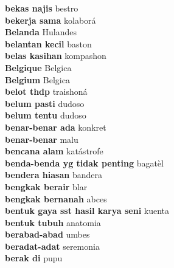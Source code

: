 \textbf{ bekas najis  } bestro \\
\textbf{ bekerja sama  } kolaborá \\
\textbf{ Belanda  } Hulandes \\
\textbf{ belantan kecil  } baston \\
\textbf{ belas kasihan  } kompashon \\
\textbf{ Belgique  } Belgica \\
\textbf{ Belgium  } Belgica \\
\textbf{ belot thdp  } traishoná \\
\textbf{ belum pasti  } dudoso \\
\textbf{ belum tentu  } dudoso \\
\textbf{ benar-benar ada  } konkret \\
\textbf{ benar-benar  } malu \\
\textbf{ bencana alam  } katástrofe \\
\textbf{ benda-benda yg tidak penting  } bagatèl \\
\textbf{ bendera hiasan  } bandera \\
\textbf{ bengkak berair  } blar \\
\textbf{ bengkak bernanah  } abces \\
\textbf{ bentuk gaya sst hasil karya seni  } kuenta \\
\textbf{ bentuk tubuh  } anatomia \\
\textbf{ berabad-abad  } umbes \\
\textbf{ beradat-adat  } seremonia \\
\textbf{ berak di  } pupu \\
